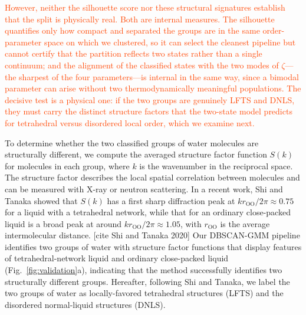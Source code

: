 \documentclass[aps, amsmath,amssymb, reprint, twocolumn, superscriptaddress]{revtex4-2}
\newcommand{\comment}[1]{\textcolor{Mahogany}{#1}}
\newcommand{\edit}[1]{\textcolor{OrangeRed}{#1}}
\begin{document}
\edit{However, neither the silhouette score nor these structural signatures establish that the split is physically real. Both are internal measures. The silhouette quantifies only how compact and separated the groups are in the same order-parameter space on which we clustered, so it can select the cleanest pipeline but cannot certify that the partition reflects two states rather than a single continuum; and the alignment of the classified states with the two modes of $\zeta$---the sharpest of the four parameters---is internal in the same way, since a bimodal parameter can arise without two thermodynamically meaningful populations. The decisive test is a physical one: if the two groups are genuinely LFTS and DNLS, they must carry the distinct structure factors that the two-state model predicts for tetrahedral versus disordered local order, which we examine next.}

To determine whether the two classified groups of water molecules are structurally different,  we compute the averaged structure factor function $S(k)$ for molecules in each group, where $k$ is the wavenumber in the reciprocal space. The structure factor describes the local spatial correlation between molecules and can be measured with X-ray or neutron scattering. In a recent work, Shi and Tanaka showed that $S(k)$ has a first sharp diffraction peak at $kr_\text{OO}/2\pi \approx 0.75$ for a liquid with a tetrahedral network, while that for an ordinary close-packed liquid is a broad peak at around $kr_\text{OO}/2\pi \approx 1.05$, with  $r_\text{OO}$ is the average intermolecular distance. \comment{[cite Shi and Tanaka 2020]} Our DBSCAN-GMM pipeline identifies two groups of water with structure factor functions that display features of tetrahedral-network liquid and ordinary close-packed liquid (Fig.~\ref{fig:validation}a), indicating that the method successfully identifies two structurally different groups. Hereafter, following Shi and Tanaka, we label the two groups of water as locally-favored tetrahedral structures (LFTS) and the disordered normal-liquid structures (DNLS). 
\end{document}
